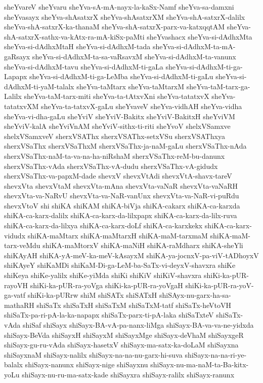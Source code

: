 {sheYvareV
sheYvaru
sheYva-sA-mA-nayx-la-kaSx-Namf
sheYva-sa-damxni
sheYvasayx
sheYva-shAsatxrX
sheYva-shAsatxrXM
sheYva-shA-satxrX-dalilx
sheYva-shA-satxrX-ka-thanaM
sheYva-shA-satxrX-parx-va-katxqqtAM
sheYva-shA-satxrX-sathx-va-kAtx-ra-mA-kiSx-paMti
sheYvashacx
sheYva-si-dAdhxMta
sheYva-si-dAdhxMtaH
sheYva-si-dAdhxM-tada
sheYva-si-dAdhxM-ta-mA-gaRsayx
sheYva-si-dAdhxM-ta-sa-vaRsavxM
sheYva-si-dAdhxM-ta-vanunx
sheYva-si-dAdhxM-tavu
sheYva-si-dAdhxM-ti-gaLa
sheYva-si-dAdhxM-ti-ga-Lapapx
sheYva-si-dAdhxM-ti-ga-LeMba
sheYva-si-dAdhxM-ti-gaLu
sheYva-si-dAdhxM-ti-yaM-talalx
sheYva-taMtarx
sheYva-taMtarxM
sheYva-taM-tarx-ga-Lalilx
sheYva-taM-tarx-miti
sheYva-ta-tAtxvXni
sheYva-tatatxvX
sheYva-tatatxvXM
sheYva-ta-tatxvX-gaLu
sheYvaveV
sheYva-vidhAH
sheYva-vidha
sheYva-vi-dha-gaLu
sheYviV
sheYviV-Bakitx
sheYviV-BakitxH
sheYviVM
sheYviV-kalA
sheYviVnAM
sheYviV-sithx-ti-riti
sheYvoV
shelxVSamxve
shelxVSamxveV
sherxVSAThx
sherxVSAThx-setxVSu
sherxVSAThxya
sherxVSaThx
sherxVSaThxM
sherxVSaThx-ja-naM-gaLu
sherxVSaThx-nAda
sherxVSaThx-naM-ta-va-na-ha-niRshaM
sherxVSaThx-reM-bu-danunx
sherxVSaThx-vAda
sherxVSaThx-vA-dudu
sherxVSaThx-vA-gidudx
sherxVSaThx-va-papxM-dade
shevxV
shevxVtAdi
shevxVtA-shavx-tareV
shevxVta
shevxVtaM
shevxVta-mAna
shevxVta-vaNaR
shevxVta-vaNaRH
shevxVta-va-NaRvU
shevxVta-va-NaR-vanUnx
shevxVta-va-NaR-vi-puRdu
shevxVtoV
shi
shiKA
shiKAM
shiKA-biVja
shiKA-cakarx
shiKA-ca-karxda
shiKA-ca-karx-dalilx
shiKA-ca-karx-da-lilxpapx
shiKA-ca-karx-da-lilx-ruva
shiKA-ca-karx-da-lilxya
shiKA-ca-karx-doLf
shiKA-ca-karxkekx
shiKA-ca-karx-vidudx
shiKA-maMtarx
shiKA-maMtarxH
shiKA-maM-tarxmaM
shiKA-maM-tarx-veMdu
shiKA-maMtorxV
shiKA-maNiH
shiKA-raMdharx
shiKA-sheYli
shiKAyAH
shiKA-yA-meV-ka-meV-kAsayxM
shiKA-ya-jocnxV-pa-viV-tADhoyxV
shiKAyeY
shiKaMDi
shiKaM-Di-ga-LeM-ba-SaTx-vi-deyxV-shavxra
shiKe
shiKeya
shiKe-yalilx
shiKe-yiMda
shiKi
shiKiV
shiKiV-shavxra
shiKi-ka-pUR-rayoVH
shiKi-ka-pUR-ra-yoVga
shiKi-ka-pUR-ra-yoVgaH
shiKi-ka-pUR-ra-yoV-ga-vatf
shiKi-ka-pURrw
shiM
shiSATx
shiSATxH
shiSAyx-nu-garx-ha-sa-mathaRH
shiSaTx
shiSaTxH
shiSaTxM
shiSaTxM-tatf
shiSaTx-heVtoVH
shiSaTx-pa-ri-pA-la-ka-napapx
shiSaTx-parx-ti-pA-laka
shiSaTxteV
shiSaTx-vAda
shiSaf
shiSayx
shiSayx-BA-vA-pa-nanx-liMga
shiSayx-BA-va-va-ne-yidxda
shiSayx-BeVda
shiSayxH
shiSayxM
shiSayxMge
shiSayx-deVhaM
shiSayxgeR
shiSayx-gu-ru-vAda
shiSayx-hasetxV
shiSayx-ma-satx-ka-doLaM
shiSayxna
shiSayxnaM
shiSayx-nalilx
shiSayx-na-na-nu-garx-hi-suva
shiSayx-na-na-ri-ye-balalx
shiSayx-nanunx
shiSayx-nige
shiSayxnu
shiSayx-nu-ma-naM-ta-Ba-kitx-yoLu
shiSayx-nu-ru-ma-satx-kade
shiSayxra
shiSayx-ralilx
shiSayx-ranunx
}
